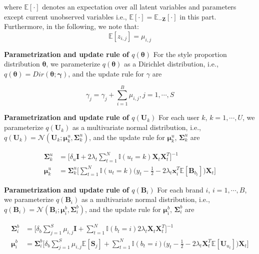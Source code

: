 \noindent where $\mathbb{E}[\cdot]$ denotes an expectation over all latent variables and parameters except current unobserved variables i.e., $\mathbb{E}[\cdot]=\mathbb{E}_{-\bm{Z}}[\cdot]$ in this part. Furthermore, in the following, we note that: 
\begin{equation}
\label{eq:hidden}
\mathbb{E}[z_{i,j}]=\mu_{i,j}
\end{equation}

\noindent \textbf{Parametrization and update rule of $q(\mathbf{\theta})$}
For the style proportion distribution $\mathbf{\theta}$, we parameterize $q(\mathbf{\theta})$ as a Dirichlet distribution, i.e., $q(\mathbf{\theta}) = Dir(\mathbf{\theta}; \mathbf{\gamma})$, and the update rule for $\gamma$ are 

\begin{equation}
\label{eq:start}
\gamma_j = \gamma_j + \sum_{i=1}^B \mu_{i,j}, j=1,\cdots,S
\end{equation}



\noindent \textbf{Parametrization and update rule of $q(\mathbf{U}_k)$}
For each user $k$, $k = 1, \cdots, U$, we parameterize $q(\mathbf{U}_k)$ as a multivariate normal distribution, i.e., $q(\mathbf{U}_k) = \mathcal{N}(\mathbf{U}_k; \bm{\mu}^u_k, \bm{\Sigma}_k^u)$, and the update rule for $\bm{\mu}^u_k$, $\bm{\Sigma}_k^u$ are 

\begin{align}
\bm{\Sigma}_k^u & = \big[  \delta_u \mathbf{I} + 2\lambda_t \sum_{t=1}^N \mathbb{I}(u_t = k) \mathbf{X}_t \mathbf{X}_t^T  \big]^{-1} \\ 
\bm{\mu}^u_k & = \bm{\Sigma}_k^u\Big[  \sum_{t=1}^N\mathbb{I}(u_t=k)  \big(y_t-\frac{1}{2}-2\lambda_{t}\mathbf{x}_i^T\mathbb{E}[\mathbf{B}_{b_t}]\big)\mathbf{X}_t \Big]
\end{align}

\noindent \textbf{Parametrization and update rule of $q(\mathbf{B}_i)$}
For each brand $i$, $i = 1, \cdots, B$, we parameterize $q(\mathbf{B}_i)$ as a multivariate normal distribution, i.e., $q(\mathbf{B}_i) = \mathcal{N}(\mathbf{B}_i; \bm{\mu}^b_i, \bm{\Sigma}^b_i)$, and the update rule for $\bm{\mu}^b_i$, $\bm{\Sigma}^b_i$ are 

\begin{align}
\bm{\Sigma}^b_i & = \Big[\delta_b\sum_{j=1}^S\mu_{i,j}\mathbf{I}+\sum_{t=1}^N\mathbb{I}(b_t=i)2\lambda_{t}\mathbf{X}_t\mathbf{X}_t^T\Big]^{-1} \\ 
\bm{\mu}^b_i & = \bm{\Sigma}_i^b\Big[  \delta_b\sum_{j=1}^S\mu_{i,j}\mathbb{E}[\mathbf{S}_j]+ 
 \sum_{t=1}^N\mathbb{I}(b_t=i)\big(y_t-\frac{1}{2}- 2\lambda_{t}\mathbf{X}_t^T\mathbb{E}[\mathbf{U}_{u_t}]\big)\bm{X}_t \Big]
\end{align}


